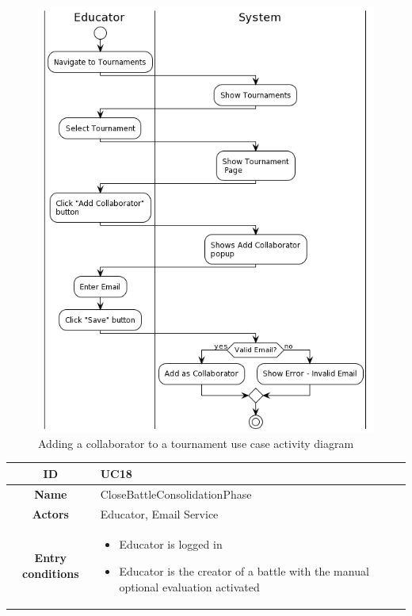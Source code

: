 \begin{center}
\begin{tabular}{ |c|m{10cm}| }
        \hline
    \end{tabular}
    \begin{figure}[H]
        \hspace{50px}
        \includegraphics[scale=0.5]{Diagrams/activity_addcollaborator.png}
        \caption{Adding a collaborator to a tournament use case activity diagram}
    \end{figure}
    \begin{tabular}{ |c|m{10cm}| }
        \hline
        \textbf{ID} & UC18 \\
        \hline
        \textbf{Name} & CloseBattleConsolidationPhase \\
        \hline
        \textbf{Actors} & Educator, Email Service \\
        \hline
        \textbf{Entry conditions} &
        \begin{itemize}
            \item Educator is logged in
            \item Educator is the creator of a battle with the manual optional evaluation activated

\end{itemize}
\end{tabular}
\end{center}
